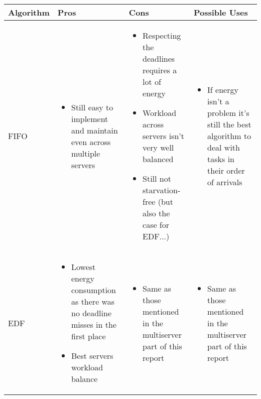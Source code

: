\documentclass[./report.tex]{subfiles}
\begin{document}
\begin{tabular}{|m{8em}|m{12em}|m{12em}|m{12em}|} 
	\hline 
	\textbf{Algorithm} & \textbf{Pros} & \textbf{Cons} & \textbf{Possible Uses} \\ 
	\hline
	FIFO 
	&  
	\begin{itemize}[leftmargin=*]
		\item Still easy to implement and maintain even across multiple servers
	\end{itemize}
	&  
	\begin{itemize}[leftmargin=*]
		\item Respecting the deadlines requires a lot of energy
		\item Workload across servers isn't very well balanced
		\item Still not starvation-free (but also the case for EDF...)
	\end{itemize}
	& 
	\begin{itemize}[leftmargin=*]
		\item If energy isn't a problem it's still the best algorithm to deal with tasks in their order of arrivals
	\end{itemize}
	\\
	\hline
	EDF 
	&  
	\begin{itemize}[leftmargin=*]
		\item Lowest energy consumption as there was no deadline misses in the first place
		\item Best servers workload balance
	\end{itemize}
	&  
	\begin{itemize}[leftmargin=*]
		\item Same as those mentioned in the multiserver part of this report
	\end{itemize}
	& 
	\begin{itemize}[leftmargin=*]
		\item Same as those mentioned in the multiserver part of this report
	\end{itemize}
	\\
	\hline
\end{tabular}
\end{document}
